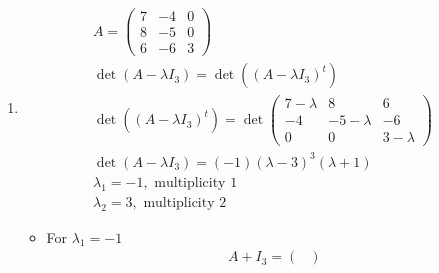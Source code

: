 \begin{enumerate}
\begin{itemize}
\begin{gather}
\begin{gmatrix}[left]
1 & -1&\\
1 & 1&
\end{gmatrix}
\begin{gmatrix}[right]
1 & 0\\
0 & 1
\end{gmatrix}
\leadsto
\begin{gmatrix}[left]
1 & 0&\\
0 & 1&
\end{gmatrix}
\begin{gmatrix}[right]
\mfrac{1}{2} & \mfrac{1}{2} \\
\mfrac{-1}{2} & \mfrac{1}{2}
\end{gmatrix}\\
\implies Q^{-1} = \begin{pmatrix}
\mfrac{1}{2} & \mfrac{1}{2}\\
\mfrac{-1}{2} & \mfrac{1}{2}
\end{pmatrix}\\
\implies Q^{-1}AQ = D = \begin{pmatrix}
4 & 0 \\
0 & -2 
\end{pmatrix}
\end{gather}
\end{itemize}
\setcounter{enumii}{3}
\item
\begin{gather}
A = \begin{pmatrix}
7 & -4 & 0\\
8 & -5 & 0\\
6 & -6 & 3
\end{pmatrix}\\
\det{(A-\lambda I_3)} = \det{((A-\lambda I_3)^t)}\\
\det{((A-\lambda I_3)^t)} = \det{\begin{pmatrix}
7-\lambda & 8 & 6\\
-4 & -5-\lambda & -6\\
0 & 0 & 3-\lambda 
  \end{pmatrix}}\\
\det{(A-\lambda I_3)} = (-1)(\lambda-3)^3(\lambda+1)\\
\lambda_1 = -1, \text{ multiplicity 1}\\
\lambda_2 = 3, \text{ multiplicity 2}
\end{gather}
\begin{itemize}
\item For $\lambda_1 = -1$
\begin{gather}
A+I_3 = \begin{pmatrix}

\end{pmatrix}
\end{gather}
\end{itemize}
\end{enumerate}
